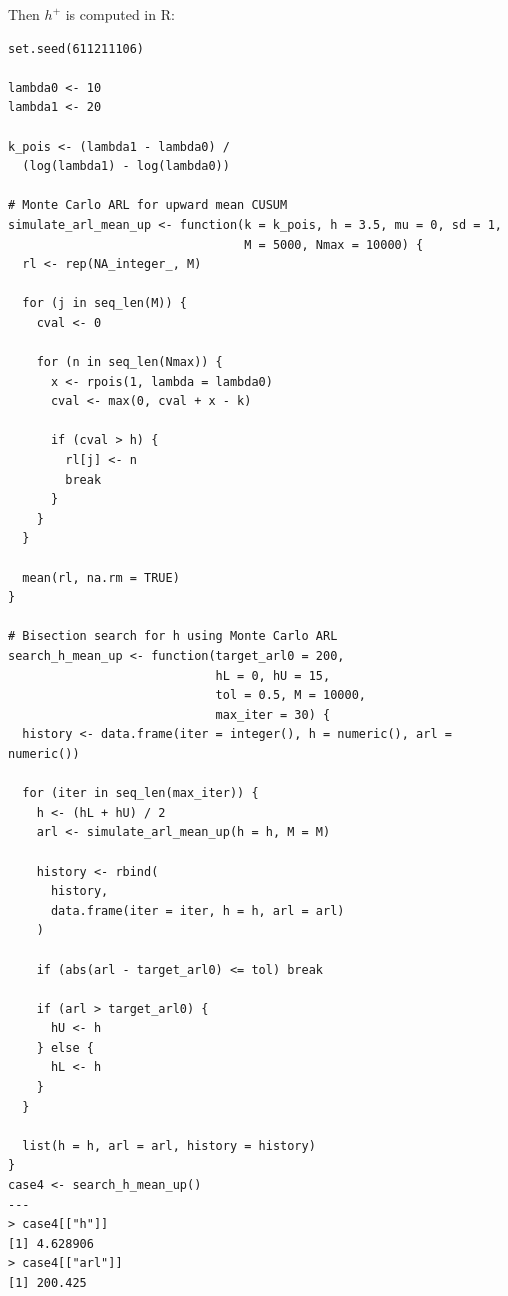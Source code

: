 \documentclass[a4paper, 12pt]{article}  %
\begin{document}
Then \(h^+\) is computed in R:
\begin{codeblock}
\begin{verbatim}
set.seed(611211106)

lambda0 <- 10
lambda1 <- 20

k_pois <- (lambda1 - lambda0) /
  (log(lambda1) - log(lambda0))

# Monte Carlo ARL for upward mean CUSUM
simulate_arl_mean_up <- function(k = k_pois, h = 3.5, mu = 0, sd = 1,
                                 M = 5000, Nmax = 10000) {
  rl <- rep(NA_integer_, M)

  for (j in seq_len(M)) {
    cval <- 0

    for (n in seq_len(Nmax)) {
      x <- rpois(1, lambda = lambda0)
      cval <- max(0, cval + x - k)

      if (cval > h) {
        rl[j] <- n
        break
      }
    }
  }

  mean(rl, na.rm = TRUE)
}

# Bisection search for h using Monte Carlo ARL
search_h_mean_up <- function(target_arl0 = 200,
                             hL = 0, hU = 15,
                             tol = 0.5, M = 10000,
                             max_iter = 30) {
  history <- data.frame(iter = integer(), h = numeric(), arl = numeric())

  for (iter in seq_len(max_iter)) {
    h <- (hL + hU) / 2
    arl <- simulate_arl_mean_up(h = h, M = M)

    history <- rbind(
      history,
      data.frame(iter = iter, h = h, arl = arl)
    )

    if (abs(arl - target_arl0) <= tol) break

    if (arl > target_arl0) {
      hU <- h
    } else {
      hL <- h
    }
  }

  list(h = h, arl = arl, history = history)
}
case4 <- search_h_mean_up()
---
> case4[["h"]]
[1] 4.628906
> case4[["arl"]]
[1] 200.425
\end{verbatim}
\end{codeblock}
\end{document}
